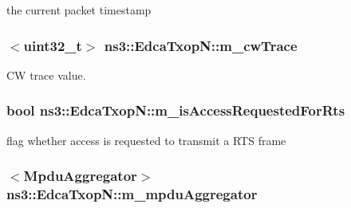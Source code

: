 the current packet timestamp 

\subsubsection[{\texorpdfstring{m\+\_\+cw\+Trace}{m_cwTrace}}]{$<$uint32\+\_\+t$>$ ns3\+::\+Edca\+Txop\+N\+::m\+\_\+cw\+Trace\hspace{0.3cm}{\ttfamily [private]}}\hypertarget{classns3_1_1EdcaTxopN_ad55746ea4042e254b2267905e6ecfe66}{}\label{classns3_1_1EdcaTxopN_ad55746ea4042e254b2267905e6ecfe66}


CW trace value. 

\subsubsection[{\texorpdfstring{m\+\_\+is\+Access\+Requested\+For\+Rts}{m_isAccessRequestedForRts}}]{\setlength{\rightskip}{0pt plus 5cm}bool ns3\+::\+Edca\+Txop\+N\+::m\+\_\+is\+Access\+Requested\+For\+Rts\hspace{0.3cm}{\ttfamily [private]}}\hypertarget{classns3_1_1EdcaTxopN_a2dbb9cad85e4871b031dc1169c88bb08}{}\label{classns3_1_1EdcaTxopN_a2dbb9cad85e4871b031dc1169c88bb08}


flag whether access is requested to transmit a R\+TS frame 

\subsubsection[{\texorpdfstring{m\+\_\+mpdu\+Aggregator}{m_mpduAggregator}}]{$<${\bf Mpdu\+Aggregator}$>$ ns3\+::\+Edca\+Txop\+N\+::m\+\_\+mpdu\+Aggregator\hspace{0.3cm}{\ttfamily [private]}}\hypertarget{classns3_1_1EdcaTxopN_abdec6101737b07b2c816c22910d60f53}{}\label{classns3_1_1EdcaTxopN_abdec6101737b07b2c816c22910d60f53}


